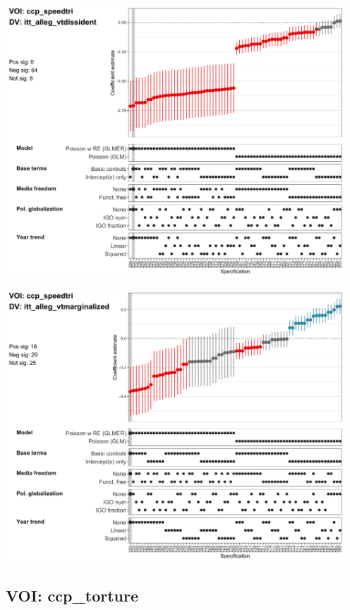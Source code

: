 \documentclass[]{article}
\begin{document}
\includegraphics[height=4in]{../output/figures-robustness/specplot-ccp_speedtri-itt_alleg_vtdissident.png}

\includegraphics[height=4in]{../output/figures-robustness/specplot-ccp_speedtri-itt_alleg_vtmarginalized.png}

\hypertarget{voi-ccp_torture}{%
\subsection{VOI: ccp\_torture}\label{voi-ccp_torture}}
\end{document}
